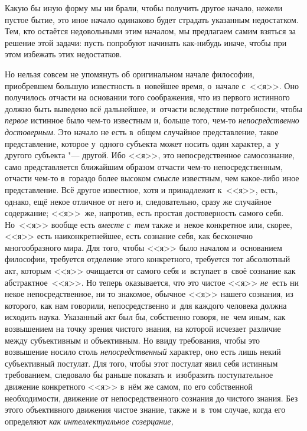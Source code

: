 Какую бы иную форму мы ни брали, чтобы получить другое начало, нежели пустое
бытие, это иное начало одинаково будет страдать указанным недостатком.
Тем, кто остаётся недовольными этим началом, мы предлагаем самим взяться
за решение этой задачи: пусть попробуют начинать как-нибудь иначе, чтобы
при этом избежать этих недостатков.

Но нельзя совсем не упомянуть об оригинальном начале философии, приобревшем
большую известность в~новейшее время, о~начале с~<<я>>. Оно получилось отчасти на основании того соображения,
что из первого истинного должно быть выведено всё дальнейшее, и~отчасти
вследствие потребности, чтобы {\em первое} истинное было чем-то известным и,
больше того, чем-то {\em непосредственно достоверным}. Это начало не есть
в~общем случайное представление, такое представление, которое у~одного субъекта
может носить один характер, а~у другого субъекта "--- другой. Ибо <<я>>, это
непосредственное самосознание, само представляется ближайшим образом отчасти
чем-то непосредственным, отчасти чем-то в~гораздо более высоком смысле
известным, чем какое-либо иное представление. Всё другое известное, хотя и
принадлежит к~<<я>>, есть, однако, ещё некое отличное от него и, следовательно,
сразу же случайное содержание; <<я>>~же, напротив, есть простая достоверность
самого себя. Но~<<я>> вообще есть {\em вместе с~тем} также и~некое конкретное
или, скорее, <<я>> есть наиконкретнейшее, есть сознание себя, как бесконечно
многообразного мира. Для того, чтобы <<я>> было началом и~основанием философии,
требуется отделение этого конкретного, требуется тот абсолютный акт, которым
<<я>> очищается от самого себя и~вступает в~своё сознание как
абстрактное~<<я>>. Но теперь оказывается, что это чистое <<я>> {\em не}~есть ни некое
непосредственное, ни то знакомое, обычное <<я>> нашего сознания, из которого,
как нам говорили, непосредственно и~для каждого человека должна исходить наука.
Указанный акт был бы, собственно говоря, не~чем иным, как возвышением на точку
зрения чистого знания, на которой исчезает различие между субъективным и
объективным. Но ввиду требования, чтобы это возвышение носило столь
{\em непосредственный} характер, оно есть лишь некий субъективный постулат. Для
того, чтобы этот постулат явил себя истинным требованием, следовало бы раньше
показать и~изобразить поступательное движение конкретного <<я>> в~нём же самом,
по его собственной необходимости, движение от непосредственного сознания до
чистого знания. Без этого объективного движения чистое знание, также и~в~том
случае, когда его определяют {\em как интеллектуальное созерцание,}
